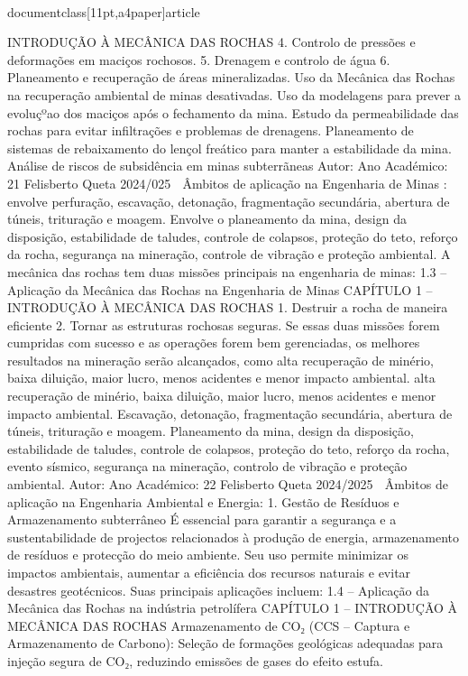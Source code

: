 \\documentclass[11pt,a4paper]{article}
\begin{document}
 INTRODUÇÃO À MECÂNICA DAS ROCHAS
4. Controlo de pressões e deformações em 
maciços rochosos.
5. Drenagem e controlo de água
6. Planeamento e recuperação de áreas 
mineralizadas.
Uso da Mecânica das Rochas na recuperação ambiental de minas 
desativadas.
Uso da modelagens para prever a evoluçºao dos maciços após o 
fechamento da mina.
Estudo da permeabilidade das rochas para evitar infiltrações e
problemas de drenagens.
Planeamento de sistemas de rebaixamento do lençol freático para 
manter a estabilidade da mina.
Análise de riscos de subsidência em minas subterrãneas
Autor:
Ano Académico:
21
Felisberto Queta
2024/025

 Âmbitos de aplicação na Engenharia de Minas
:
envolve perfuração, escavação, detonação, fragmentação secundária,
abertura de túneis, trituração e moagem.
Envolve o planeamento da mina, design da disposição, estabilidade de 
taludes, controle de colapsos, proteção do teto, reforço da rocha, 
segurança na mineração, controle de vibração e proteção ambiental.
A mecânica das rochas tem duas missões principais na engenharia de minas:
1.3 – Aplicação da Mecânica das Rochas na Engenharia de Minas
CAPÍTULO 1 
–
 INTRODUÇÃO À MECÂNICA DAS ROCHAS
1. Destruir a rocha de maneira eficiente
2. Tornar as estruturas rochosas seguras.
Se essas duas missões forem cumpridas com sucesso e as operações forem bem gerenciadas, os melhores resultados na 
mineração serão alcançados, como alta recuperação de minério, baixa diluição, maior lucro, menos acidentes e menor 
impacto ambiental.
alta recuperação de 
minério, baixa 
diluição, maior lucro, 
menos acidentes e 
menor impacto 
ambiental.
Escavação, detonação, 
fragmentação 
secundária, abertura de 
túneis, trituração e 
moagem.
Planeamento da mina, 
design da disposição, 
estabilidade de taludes, 
controle de colapsos, 
proteção do teto, reforço 
da rocha, evento 
sísmico, segurança na 
mineração, controlo de 
vibração e proteção 
ambiental.
Autor:
Ano Académico:
22
Felisberto Queta
2024/2025

 Âmbitos de aplicação 
na Engenharia Ambiental e Energia:
1. Gestão de Resíduos e Armazenamento subterrâneo
É essencial para garantir a segurança e a sustentabilidade de projectos relacionados à produção de energia,
armazenamento de resíduos e protecção do meio ambiente. Seu uso permite minimizar os impactos ambientais, aumentar a
eficiência dos recursos naturais e evitar desastres geotécnicos. Suas principais aplicações incluem:
1.4 – Aplicação da Mecânica das Rochas na indústria petrolífera
CAPÍTULO 1 
–
 INTRODUÇÃO À MECÂNICA DAS ROCHAS
Armazenamento de CO₂ (CCS – Captura e Armazenamento de Carbono):
Seleção de formações geológicas adequadas para injeção segura de CO₂, reduzindo emissões de gases do efeito estufa.
\end{document}
